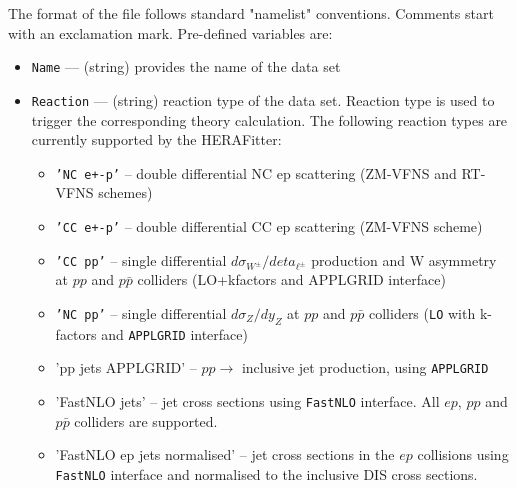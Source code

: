    The format of the file follows standard "namelist" conventions. Comments 
   start with an exclamation mark.  Pre-defined variables are:
\begin{itemize}
     \item{\tt Name}        --- (string) provides the name of the data set
    \item{\tt  Reaction}    --- (string) reaction type of the data set. Reaction type is used 
                      to trigger the corresponding theory calculation. The following 
                      reaction types  are currently supported by the HERAFitter:
                      \begin{itemize}
                        \item {\tt 'NC e+-p'}  -- double differential NC ep scattering
                                      (ZM-VFNS and RT-VFNS schemes) 
                        \item {\tt 'CC e+-p'}  -- double differential CC ep scattering
                                      (ZM-VFNS scheme)
                        \item {\tt 'CC pp'}    -- single differential $d \sigma_{W^{\pm}}/d eta_{\ell^{\pm}}$
                                      production and W asymmetry at $pp$ and $p\bar{p}$ 
                                      colliders (LO+kfactors and APPLGRID interface)
                        \item {\tt 'NC pp'}    -- single differential $d \sigma_Z / d y_Z$ at $pp$ and
                                      $p\bar{p}$ colliders
                                      ({\tt LO} with k-factors and {\tt APPLGRID} interface)

                        \item 'pp jets APPLGRID' -- $pp\to$ inclusive jet production, using
                                     {\tt APPLGRID}

                        \item 'FastNLO jets' -- jet cross sections using {\tt FastNLO} interface.
                                     All $ep$, $pp$ and $p\bar{p}$ colliders are supported.

                        \item 'FastNLO ep jets normalised' -- jet cross sections in the $ep$ collisions 
                                     using {\tt FastNLO} interface and normalised to the inclusive DIS cross sections.


\end{itemize}
\end{itemize}
